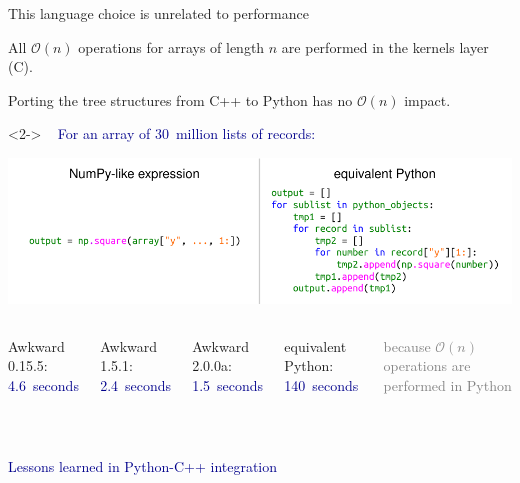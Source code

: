 \documentclass[aspectratio=169]{beamer}
\begin{document}
\begin{frame}{This language choice is unrelated to performance}
\large

\vspace{0.25 cm}
All $\mathcal{O}(n)$ operations for arrays of length $n$ are performed in the kernels layer (C).

\vspace{0.15 cm}
Porting the tree structures from C++ to Python has no $\mathcal{O}(n)$ impact.

\vspace{0.15 cm}
\begin{uncoverenv}<2->
\mbox{ } \hfill \textcolor{darkblue}{For an array of 30~million lists of records:} \hfill \mbox{ }

\includegraphics[width=\linewidth]{numpy-like-vs-equivalent-python.pdf}

\vspace{0.25 cm}
\begin{columns}
Awkward 0.15.5: \hfill\textcolor{darkblue}{4.6~seconds}

Awkward 1.5.1: \hfill\textcolor{darkblue}{2.4~seconds}

Awkward 2.0.0a: \hfill\textcolor{darkblue}{1.5~seconds}

equivalent Python: \textcolor{darkblue}{140~seconds}

\textcolor{gray}{because $\mathcal{O}(n)$ operations are performed in Python}
\end{columns}
\end{uncoverenv}
\end{frame}

\begin{frame}{\mbox{ }}
\LARGE
\begin{center}
\textcolor{darkblue}{Lessons learned in Python-C++ integration}
\end{center}
\end{frame}
\end{document}
